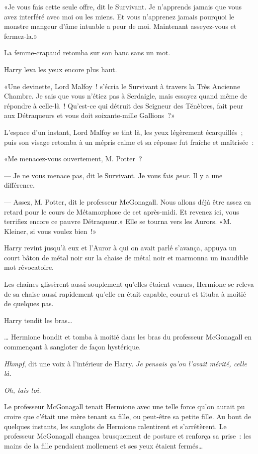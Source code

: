 «Je vous fais cette seule offre, dit le Survivant. Je n'apprends jamais que vous avez interféré avec moi ou les miens. Et vous n'apprenez jamais pourquoi le monstre mangeur d'âme intuable a peur de moi. Maintenant asseyez-vous et fermez-la.»

La femme-crapaud retomba sur son banc sans un mot.

Harry leva les yeux encore plus haut.

«Une devinette, Lord Malfoy~! s'écria le Survivant à travers la Très Ancienne Chambre. Je sais que vous n'étiez pas à Serdaigle, mais essayez quand même de répondre à celle-là~! Qu'est-ce qui détruit des Seigneur des Ténèbres, fait peur aux Détraqueurs et vous doit soixante-mille Gallions~?»

L'espace d'un instant, Lord Malfoy se tint là, les yeux légèrement écarquillés~; puis son visage retomba à un mépris calme et sa réponse fut fraîche et maîtrisée~:

«Me menacez-vous ouvertement, M. Potter~?

--- Je ne vous menace pas, dit le Survivant. Je vous fais \emph{peur}. Il y a une différence.

--- Assez, M. Potter, dit le professeur McGonagall. Nous allons déjà être assez en retard pour le cours de Métamorphose de cet après-midi. Et revenez ici, vous terrifiez encore ce pauvre Détraqueur.» Elle se tourna vers les Aurors. «M. Kleiner, si vous voulez bien~!»

Harry revint jusqu'à eux et l'Auror à qui on avait parlé s'avança, appuya un court bâton de métal noir sur la chaise de métal noir et marmonna un inaudible mot révocatoire.

Les chaînes glissèrent aussi souplement qu'elles étaient venues, Hermione se releva de sa chaise aussi rapidement qu'elle en était capable, courut et tituba à moitié de quelques pas.

Harry tendit les bras…

… Hermione bondit et tomba à moitié dans les bras du professeur McGonagall en commençant à sangloter de façon hystérique.

\emph{Hhmpf}, dit une voix à l'intérieur de Harry. \emph{Je pensais qu'on l'avait mérité, celle là.}

\emph{Oh, tais toi.}

Le professeur McGonagall tenait Hermione avec une telle force qu'on aurait pu croire que c'était une mère tenant sa fille, ou peut-être sa petite fille. Au bout de quelques instants, les sanglots de Hermione ralentirent et s'arrêtèrent. Le professeur McGonagall changea brusquement de posture et renforça sa prise~: les mains de la fille pendaient mollement et ses yeux étaient fermés…

